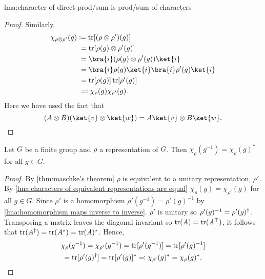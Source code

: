 \begin{lma}{}{lma:character of direct prod/sum is prod/sum of characters}
\begin{proof}
        Similarly,
        \begin{align}
            \chi_{\rho\directproduct\rho'}(g) &\coloneqq
            \tr[(\rho\directproduct\rho')(g)]\\
            &\hphantom{:}= \tr[\rho(g) \directproduct \rho'(g)]\\
            &\hphantom{:}= \bra{i}(\rho(g)\directproduct\rho'(g))\ket{i}\\
            &\hphantom{:}= \bra{i}\rho(g)\ket{i}\bra{i}\rho'(g)\ket{i}\\
            &\hphantom{:}= \tr[\rho(g)]\tr[\rho'(g)]\\
            &\hphantom{:}\eqqcolon \chi_\rho(g) \chi_{\rho'}(g).
        \end{align}
        Here we have used the fact that
        \begin{equation}
            (A\directproduct B) (\ket{v} \directproduct \ket{w}) = A\ket{v}
            \directproduct B\ket{w}.
        \end{equation}
    \end{proof}
\end{lma}

\begin{lma}{}{}
    Let \(G\) be a finite group and \(\rho\) a representation of \(G\).
    Then \(\chi_\rho(g^{-1}) = \chi_\rho(g)^*\) for all \(g \in G\).
    \begin{proof}
        By \cref{thm:maschke's theorem} \(\rho\) is equivalent to a unitary
        representation, \(\rho'\).
        By \cref{lma:characters of equivalent representations are equal}
        \(\chi_{\rho}(g) = \chi_{\rho'}(g)\) for all \(g \in G\).
        Since \(\rho'\) is a homomorphism \(\rho'(g^{-1}) = \rho'(g)^{-1}\)
        by \cref{lma:homomorphism maps inverse to inverse}.
        \(\rho'\) is unitary so \(\rho'(g)^{-1} = \rho'(g)^{\dagger}\).
        Transposing a matrix leaves the diagonal invariant so \(\operatorname{tr}(A) =
        \operatorname{tr}(A^\top)\), it follows that \(\operatorname{tr}(A^\dagger) = \operatorname{tr}(A^*) = \operatorname{tr}(A)^*\).
        Hence,
        \begin{multline}
            \chi_{\rho}(g^{-1}) = \chi_{\rho'}(g^{-1}) = \operatorname{tr}[\rho'(g^{-1})]
            = \operatorname{tr}[\rho'(g)^{-1}]\\
            = \operatorname{tr}[\rho'(g)^{\dagger}] = \operatorname{tr}[\rho'(g)]^* \eqqcolon
            \chi_{\rho'}(g)^* = \chi_{\rho}(g)^*.
        \end{multline}
    \end{proof}
\end{lma}

